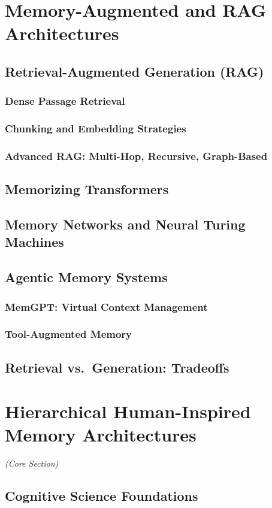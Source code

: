 \documentclass[12pt, letterpaper]{article}
\begin{document}
\section{Memory-Augmented and RAG Architectures}
\subsection{Retrieval-Augmented Generation (RAG)}
\subsubsection{Dense Passage Retrieval}
\subsubsection{Chunking and Embedding Strategies}
\subsubsection{Advanced RAG: Multi-Hop, Recursive, Graph-Based}
\subsection{Memorizing Transformers}
\subsection{Memory Networks and Neural Turing Machines}
\subsection{Agentic Memory Systems}
\subsubsection{MemGPT: Virtual Context Management}
\subsubsection{Tool-Augmented Memory}
\subsection{Retrieval vs.\ Generation: Tradeoffs}

\section{Hierarchical Human-Inspired Memory Architectures}
\textit{(Core Section)}
\subsection{Cognitive Science Foundations}
\end{document}
